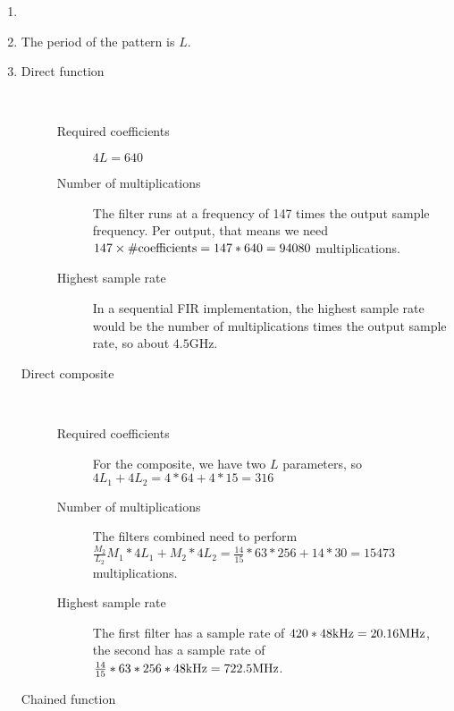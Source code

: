 
\begin{enumerate}
	\item %
	\item %
		The period of the pattern is $L$.
	\item %
		\begin{description}
			\item[Direct function]\hfill\\
				\begin{description}
					\item[Required coefficients] $4L = 640$
					\item[Number of multiplications] The filter runs at a frequency of 147 times the output sample frequency. Per output, that means we need $147 \times \#\textnormal{coefficients} = 147*640 = 94080$ multiplications.
					\item[Highest sample rate] In a sequential FIR implementation, the highest sample rate would be the number of multiplications times the output sample rate, so about $4.5$GHz.
				\end{description}
			\item[Direct composite]\hfill\\
				\begin{description}
					\item[Required coefficients] For the composite, we have two $L$ parameters, so $4L_1 + 4L_2 = 4*64 + 4*15 = 316$
					\item[Number of multiplications] The filters combined need to perform $\frac{M_2}{L_2}M_1 * 4L_1 + M_2 * 4L_2 = \frac{14}{15}*63*256+14*30 = 15473$ multiplications.
					\item[Highest sample rate] The first filter has a sample rate of $420  * 48\textnormal{kHz} = 20.16\textnormal{MHz}$, the second has a sample rate of $\frac{14}{15}*63*256* 48\textnormal{kHz} = 722.5\textnormal{MHz}$.
				\end{description}
			\item[Chained function]\hfill\\
				\begin{description}

\end{description}
\end{description}
\end{enumerate}
